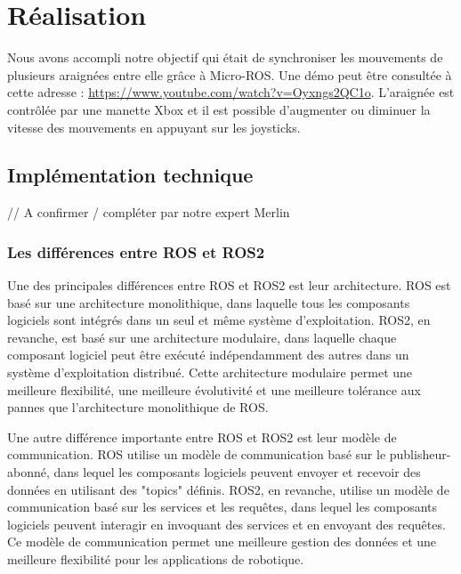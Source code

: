 	\chapter{Réalisation}

Nous avons accompli notre objectif qui était de synchroniser les mouvements de plusieurs araignées 
entre elle grâce à Micro-ROS.
Une démo peut être consultée à cette adresse : \url{https://www.youtube.com/watch?v=Oyxngs2QC1o}.
\linebreak
L'araignée est contrôlée par une manette Xbox et il est possible d'augmenter ou diminuer la vitesse des mouvements en appuyant sur 
les joysticks.

		\section{Implémentation technique}

// A confirmer / compléter par notre expert Merlin

			\subsection{Les différences entre ROS et ROS2}

Une des principales différences entre ROS et ROS2 est leur architecture. ROS est basé sur une architecture monolithique, 
dans laquelle tous les composants logiciels sont intégrés dans un seul et même système d'exploitation. 
ROS2, en revanche, est basé sur une architecture modulaire, dans laquelle chaque composant logiciel peut être exécuté 
indépendamment des autres dans un système d'exploitation distribué. Cette architecture modulaire permet une meilleure flexibilité, 
une meilleure évolutivité et une meilleure tolérance aux pannes que l'architecture monolithique de ROS. 
\linebreak

Une autre différence importante entre ROS et ROS2 est leur modèle de communication. ROS utilise un modèle de communication basé 
sur le publisheur-abonné, dans lequel les composants logiciels peuvent envoyer et recevoir des données en utilisant des "topics" définis. 
ROS2, en revanche, utilise un modèle de communication basé sur les services et les requêtes, dans lequel les composants logiciels peuvent 
interagir en invoquant des services et en envoyant des requêtes. Ce modèle de communication permet une meilleure gestion des données et 
une meilleure flexibilité pour les applications de robotique. 
\linebreak

